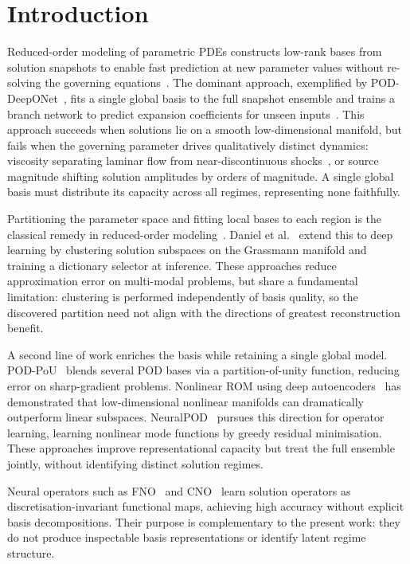 \documentclass[preprint,10pt]{elsarticle}
\begin{document}
\linenumbers

\section{Introduction}\label{sec:intro}

Reduced-order modeling of parametric PDEs constructs low-rank bases from solution snapshots to enable fast prediction at new parameter values without re-solving the governing equations~\cite{Hesthaven2016, Kovachki2024}.
The dominant approach, exemplified by POD-DeepONet~\cite{Lu2022}, fits a single global basis to the full snapshot ensemble and trains a branch network to predict expansion coefficients for unseen inputs~\cite{Lu2019, Chen1995}.
This approach succeeds when solutions lie on a smooth low-dimensional manifold, but fails when the governing parameter drives qualitatively distinct dynamics: viscosity separating laminar flow from near-discontinuous shocks~\cite{Reiss2018}, or source magnitude shifting solution amplitudes by orders of magnitude.
A single global basis must distribute its capacity across all regimes, representing none faithfully.

Partitioning the parameter space and fitting local bases to each region is the classical remedy in reduced-order modeling~\cite{Amsallem2012, Hess2019}.
Daniel et al.~\cite{Daniel2020} extend this to deep learning by clustering solution subspaces on the Grassmann manifold and training a dictionary selector at inference.
These approaches reduce approximation error on multi-modal problems, but share a fundamental limitation: clustering is performed independently of basis quality, so the discovered partition need not align with the directions of greatest reconstruction benefit.

A second line of work enriches the basis while retaining a single global model.
POD-PoU~\cite{Sharma2025} blends several POD bases via a partition-of-unity function, reducing error on sharp-gradient problems.
Nonlinear ROM using deep autoencoders~\cite{Lee2020} has demonstrated that low-dimensional nonlinear manifolds can dramatically outperform linear subspaces.
NeuralPOD~\cite{Mou2026} pursues this direction for operator learning, learning nonlinear mode functions by greedy residual minimisation.
These approaches improve representational capacity but treat the full ensemble jointly, without identifying distinct solution regimes.

Neural operators such as FNO~\cite{Li2021} and CNO~\cite{Raonic2023} learn solution operators as discretisation-invariant functional maps, achieving high accuracy without explicit basis decompositions.
Their purpose is complementary to the present work: they do not produce inspectable basis representations or identify latent regime structure.
\end{document}
